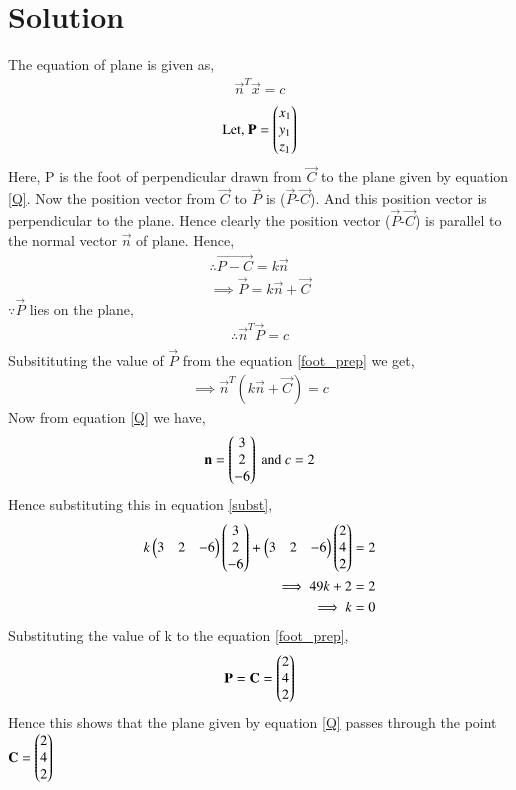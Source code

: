 \documentclass[journal,12pt,twocolumn]{IEEEtran}
\begin{document}
\section{Solution}
The equation of plane is given as, 
\begin{align}
\vec{n}^T\vec{x} = c
\end{align}
\begin{align}
\mbox{Let, } \mathbf{P} = \begin{pmatrix}x_1\\y_1\\z_1\end{pmatrix}
\end{align}
 Here, P is the foot of perpendicular drawn from $\vec{C}$ to the plane given by equation \eqref{Q}.
Now the position vector from $\vec{C}$ to $\vec{P}$ is ($\vec{P}$-$\vec{C}$). And this position vector is perpendicular to the plane. Hence clearly the position vector ($\vec{P}$-$\vec{C}$) is parallel to the normal vector $\vec{n}$ of plane. Hence,
\begin{align}
\therefore\vec{P-C} = k\vec{n}\\
\implies \vec{P} = k\vec{n}+\vec{C}\label{foot_prep}
\end{align}
$\because \vec{P}$ lies on the plane,
\begin{align}
\therefore \vec{n}^T\vec{P} = c\\
\end{align}
Subsitituting the value of $\vec{P}$ from the equation \eqref{foot_prep} we get,
\begin{align}
\implies \vec{n}^T(k\vec{n}+\vec{C}) = c
\label{subst}
\end{align}
Now from equation \eqref{Q} we have,
\begin{align}
\mathbf{n} = \begin{pmatrix}3\\2\\-6\end{pmatrix} \mbox{ and } c = 2
\end{align}
Hence substituting this in equation \eqref{subst},
\begin{align}
k\begin{pmatrix}3&2&-6\end{pmatrix}\begin{pmatrix}3\\2\\-6\end{pmatrix} + \begin{pmatrix}3&2&-6\end{pmatrix}\begin{pmatrix}2\\4\\2\end{pmatrix} = 2\\
\implies 49k+2 = 2\\
\implies k = 0
\end{align}
Substituting the value of k to the equation \eqref{foot_prep},
\begin{align}
\mathbf{P} = \mathbf{C} = \begin{pmatrix}2\\4\\2\end{pmatrix}
\end{align}
Hence this shows that the plane given by equation \eqref{Q} passes through 
the point $\mathbf{C} = \begin{pmatrix}2\\4\\2\end{pmatrix}$ 
\end{document}
